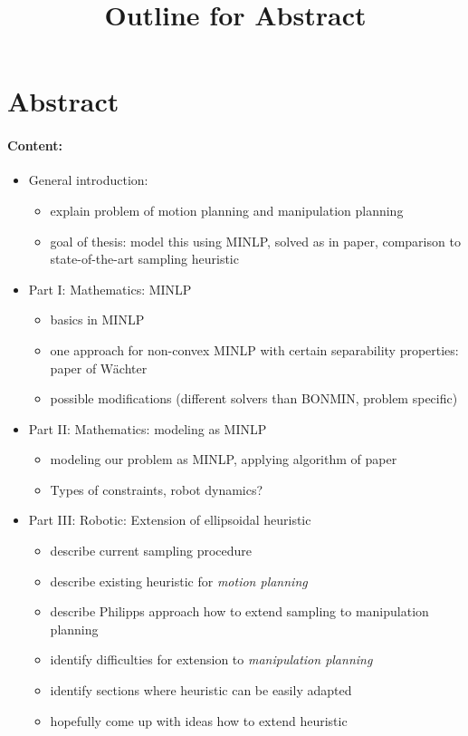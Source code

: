 \documentclass{article}
\title{\textbf{Outline for Abstract}}
\date{}
\begin{document}
\maketitle
\section{Abstract}

\paragraph{Content:}
\begin{itemize}
\item General introduction:
	\begin{itemize}
	\item explain problem of motion planning and manipulation planning
	\item goal of thesis: model this using MINLP, solved as in paper, comparison to state-of-the-art sampling heuristic
	\end{itemize}

\item Part I: Mathematics: MINLP
	\begin{itemize}
	\item basics in MINLP
	\item one approach for non-convex MINLP with certain separability properties: paper of W\"achter
	\item possible modifications (different solvers than BONMIN, problem specific)
	\end{itemize}

\item Part II: Mathematics: modeling as MINLP
	\begin{itemize}
	\item modeling our problem as MINLP, applying algorithm of paper 
	\item Types of constraints, robot dynamics?	
	\end{itemize}		
	
\item Part III: Robotic: Extension of ellipsoidal heuristic
	\begin{itemize}
	\item describe current sampling procedure
	\item describe existing heuristic for \textit{motion planning}
	\item describe Philipps approach how to extend sampling to manipulation planning
	\item identify difficulties for extension to \textit{manipulation planning}
	\item identify sections where heuristic can be easily adapted
	\item hopefully come up with ideas how to extend heuristic
	\end{itemize}
\end{itemize}
\end{document}
